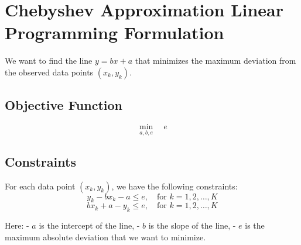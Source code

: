\documentclass{article}
\begin{document}
\section*{Chebyshev Approximation Linear Programming Formulation}

We want to find the line \( y = bx + a \) that minimizes the maximum deviation from the observed data points \((x_k, y_k)\).

\subsection*{Objective Function}
\[
\min_{a, b, e} \quad e
\]

\subsection*{Constraints}
For each data point \( (x_k, y_k) \), we have the following constraints:
\[
y_k - bx_k - a \leq e, \quad \text{for } k = 1, 2, \ldots, K
\]
\[
bx_k + a - y_k \leq e, \quad \text{for } k = 1, 2, \ldots, K
\]

Here:
- \( a \) is the intercept of the line,
- \( b \) is the slope of the line,
- \( e \) is the maximum absolute deviation that we want to minimize.
\end{document}

